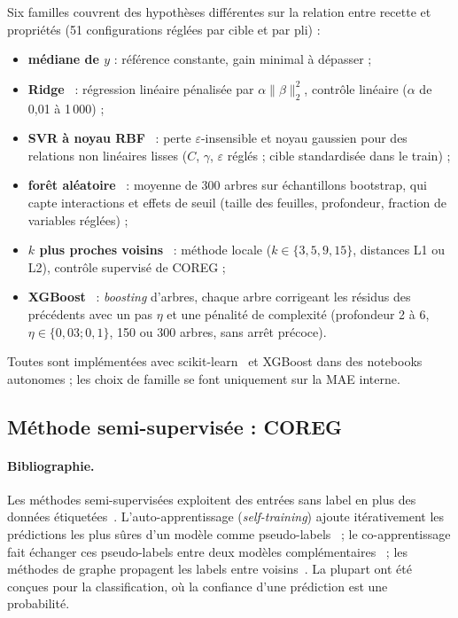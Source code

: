 \documentclass[11pt,a4paper]{article}
\begin{document}
Six familles couvrent des hypothèses différentes sur la relation entre recette
et propriétés (51 configurations réglées par cible et par pli) :
\begin{itemize}
  \item \textbf{médiane de $y$} : référence constante, gain minimal à dépasser ;
  \item \textbf{Ridge}~\cite{hoerl_1970} : régression linéaire pénalisée par $\alpha\lVert\beta\rVert_2^2$, contrôle linéaire ($\alpha$ de 0,01 à 1\,000) ;
  \item \textbf{SVR à noyau RBF}~\cite{smola_2004} : perte $\varepsilon$-insensible et noyau gaussien pour des relations non linéaires lisses ($C$, $\gamma$, $\varepsilon$ réglés ; cible standardisée dans le train) ;
  \item \textbf{forêt aléatoire}~\cite{breiman_2001} : moyenne de 300 arbres sur échantillons bootstrap, qui capte interactions et effets de seuil (taille des feuilles, profondeur, fraction de variables réglées) ;
  \item \textbf{$k$ plus proches voisins}~\cite{cover_1967} : méthode locale ($k \in \{3, 5, 9, 15\}$, distances L1 ou L2), contrôle supervisé de COREG ;
  \item \textbf{XGBoost}~\cite{chen_guestrin_2016} : \emph{boosting} d'arbres, chaque arbre corrigeant les résidus des précédents avec un pas $\eta$ et une pénalité de complexité (profondeur 2 à 6, $\eta \in \{0{,}03; 0{,}1\}$, 150 ou 300 arbres, sans arrêt précoce).
\end{itemize}
Toutes sont implémentées avec scikit-learn~\cite{pedregosa_2011} et XGBoost dans
des notebooks autonomes ; les choix de famille se font uniquement sur la MAE
interne.

\subsection{Méthode semi-supervisée : COREG}

\paragraph{Bibliographie.} Les méthodes semi-supervisées exploitent des entrées
sans label en plus des données étiquetées~\cite{chapelle_2006,vanengelen_2020}.
L'auto-apprentissage (\emph{self-training}) ajoute itérativement les prédictions
les plus sûres d'un modèle comme pseudo-labels~\cite{yarowsky_1995} ; le
co-apprentissage fait échanger ces pseudo-labels entre deux modèles
complémentaires~\cite{blum_mitchell_1998} ; les méthodes de graphe propagent les
labels entre voisins~\cite{zhu_ghahramani_2002}. La plupart ont été conçues pour
la classification, où la confiance d'une prédiction est une probabilité.
\end{document}
